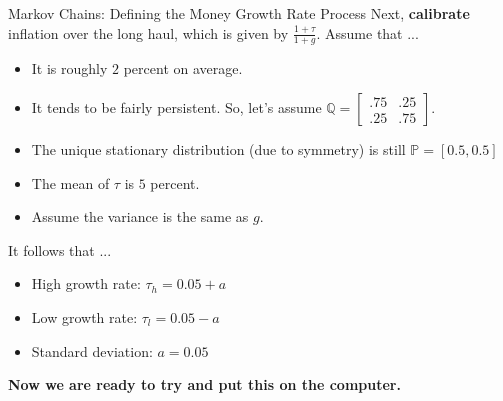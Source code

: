 \documentclass[10pt,c,aspectratio=1610,handout]{beamer}
\begin{document}
\begin{frame}{Markov Chains: Defining the Money Growth Rate Process}%
  Next, \textbf{calibrate} inflation over the long haul, which is given by $\frac{1 + \tau} {1 + g}$. Assume that ...%
  \begin{itemize}%
    \item[$\blacktriangleright$] It is roughly $2$ percent on average.%
    \item[$\blacktriangleright$] It tends to be fairly persistent. So, let's assume $ \mathbb{Q} = \left [ \begin{array}{cc} .75 & .25 \\ .25 & .75  \end{array} \right ] $.%
    \item[$\blacktriangleright$] The unique stationary distribution (due to symmetry) is still $\mathbb{P} = [0.5,0.5]$%
    \item[$\blacktriangleright$] The mean of $\tau$ is $5$ percent.%
    \item[$\blacktriangleright$] Assume the variance is the same as $g$.%
  \end{itemize}%
  \pause%
  It follows that ...%
  \begin{itemize}%
    \item[$\blacktriangleright$] High growth rate: $\tau_h = 0.05+a$%
    \item[$\blacktriangleright$] Low growth rate: $\tau_l = 0.05-a$%
    \item[$\blacktriangleright$] Standard deviation: $a = 0.05$%
  \end{itemize}%
  \vspace*{0.2in}%
  \pause%
  \begin{center}%
    \textbf{Now we are ready to try and put this on the computer.}%
  \end{center}%
\end{frame}%
\end{document}
